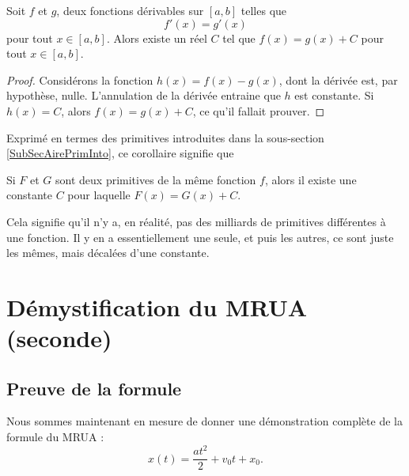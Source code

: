 \documentclass{article}
\begin{document}
\begin{corollary}
	Soit $f$ et $g$, deux fonctions dérivables sur $[a,b]$ telles que
	\begin{equation}
		f'(x) = g'(x)
	\end{equation}
	pour tout $x \in [a,b]$. Alors existe un réel $C$ tel que $f (x) = g (x) + C$ pour tout $x\in [a,b]$.
\end{corollary}

\begin{proof}
	Considérons la fonction $h(x)=f(x)-g(x)$, dont la dérivée est, par hypothèse, nulle. L'annulation de la dérivée entraine que $h$ est  constante. Si $h(x)=C$, alors $f(x)=g(x)+C$, ce qu'il fallait prouver.
\end{proof}
\addtocounter{numtho}{-1}

Exprimé en termes des primitives introduites dans la sous-section \ref{SubSecAirePrimInto}, ce corollaire signifie que
\begin{corollary}[bis]	\label{CorZeroCst}
	Si $F$ et $G$ sont deux primitives de la même fonction $f$, alors il existe une constante $C$ pour laquelle $F(x)=G(x)+C$.
\end{corollary}
Cela signifie qu'il n'y a, en réalité, pas des milliards de primitives différentes à une fonction. Il y en a essentiellement une seule, et puis les autres, ce sont juste les mêmes, mais décalées d'une constante.

					\section{Démystification du MRUA (seconde)}

					\subsection{Preuve de la formule}

Nous sommes maintenant en mesure de donner une démonstration complète de la formule du MRUA :
\begin{equation}	\label{EqMRUAINT}
	x(t) = \frac{ at^2 }{ 2 } + v_0t +x_0.
\end{equation}
\end{document}
